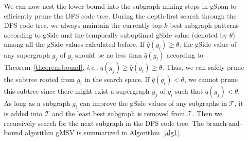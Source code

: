\documentclass[conference]{IEEEtran}
\newcommand{\gscore}[0]{gSide}
\newcommand{\galgo}[0]{gMSV}
\begin{document}
We can now nest the lower bound into the subgraph mining steps in gSpan to efficiently prune the DFS code tree. During the depth-first search through the DFS code tree, we always maintain the currently top-$k$ best subgraph patterns according to {\gscore} and the temporally suboptimal {\gscore} value (denoted by $\theta$) among all the {\gscore} values calculated before. If $\hat{q}(g_i)\ge\theta$, the {\gscore} value of any supergraph $g_j$ of $g_i$ should be no less than $\hat{q}(g_i)$ according to Theorem~\ref{theorem:bound}, \emph{i.e.}, $q(g_j)\ge\hat{q}(g_i)\ge\theta$. Thus, we can safely prune the subtree rooted from $g_i$ in the search space. If $\hat{q}(g_i)<\theta$, we cannot prune this subtree since there might exist a supergraph $g_j$ of $g_i$ such that $q(g_j)<\theta$. As long as a subgraph $g_i$ can improve the {\gscore} values of any subgraphs in $\mathcal{T}$, it is added into $\mathcal{T}$ and the least best subgraph is removed from $\mathcal{T}$. Then we recursively search for the next subgraph in the DFS code tree. The branch-and-bound algorithm {\galgo} is summarized in Algorithm~\ref{alg1}.

\end{document}
